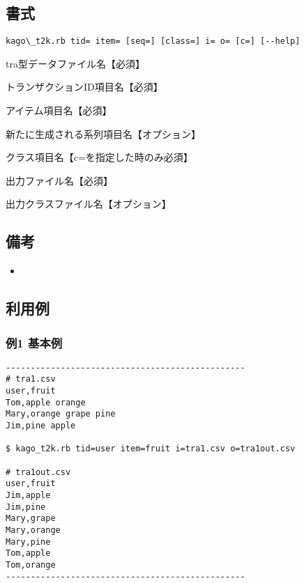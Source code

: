 \documentclass[a4paper]{jarticle}
\begin{document}
\begin{table}[htbp]
\begin{center}
\begin{tabular}{ccc}
\end{tabular} 
\end{center}
\end{table} 



\subsection*{書式}
\begin{verbatim}
kago\_t2k.rb tid= item= [seq=] [class=] i= o= [c=] [--help]
\end{verbatim}

\begin{description}
\setlength{\itemindent}{0mm}
\item[i=    ] tra型データファイル名【必須】
\item[tid=  ] トランザクションID項目名【必須】
\item[item= ] アイテム項目名【必須】
\item[seq=  ] 新たに生成される系列項目名【オプション】
\item[class=] クラス項目名【c=を指定した時のみ必須】
\item[o=    ] 出力ファイル名【必須】
\item[c=    ] 出力クラスファイル名【オプション】

\end{description}

\subsection*{備考}
\begin{itemize}
\item 
\end{itemize}

\subsection*{利用例}
\subsubsection*{例1 基本例}

\begin{verbatim}
------------------------------------------------
# tra1.csv
user,fruit
Tom,apple orange
Mary,orange grape pine
Jim,pine apple

$ kago_t2k.rb tid=user item=fruit i=tra1.csv o=tra1out.csv

# tra1out.csv
user,fruit
Jim,apple
Jim,pine
Mary,grape
Mary,orange
Mary,pine
Tom,apple
Tom,orange
------------------------------------------------
\end{verbatim}
\end{document}
